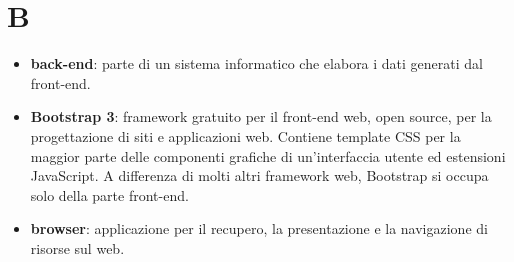 \section{B}
\begin{itemize} 
	\item \textbf{back-end}: parte di un sistema informatico che elabora i dati generati dal front-end.
	\item \textbf{Bootstrap 3}: framework gratuito per il front-end web, open source, per la progettazione di siti e applicazioni web. Contiene template CSS per la maggior parte delle componenti grafiche di un'interfaccia utente ed estensioni JavaScript. A differenza di molti altri framework web, Bootstrap si occupa solo della parte front-end.
	\item \textbf{browser}: applicazione per il recupero, la presentazione e la navigazione di risorse sul web.
\end{itemize}